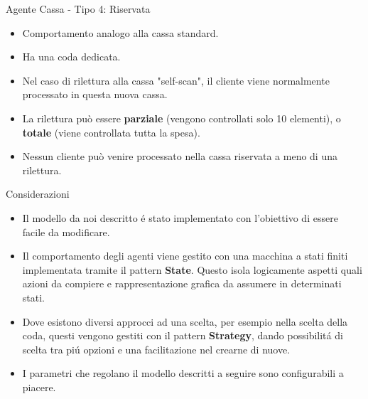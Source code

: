 \begin{frame}{Agente Cassa - Tipo 4: Riservata}
	
	\begin{itemize}
		\item Comportamento analogo alla cassa standard.
		\item Ha una coda dedicata.
		\item Nel caso di rilettura alla cassa "self-scan", il cliente viene normalmente processato in questa nuova cassa.
		\item La rilettura può essere \textbf{parziale} (vengono controllati solo 10 elementi), o \textbf{totale} (viene controllata tutta la spesa).
		\item Nessun cliente può venire processato nella cassa riservata a meno di una rilettura.
	\end{itemize}
\end{frame}




\begin{frame}{Considerazioni}
  \begin{itemize}
  \item Il modello da noi descritto é stato implementato con
    l'obiettivo di essere facile da modificare.
    
  \item Il comportamento degli agenti viene gestito con una
    macchina a stati finiti implementata tramite il pattern
    \textbf{State}.  Questo isola logicamente aspetti quali
    azioni da compiere e rappresentazione grafica da assumere in
    determinati stati.

  \item Dove esistono diversi approcci ad una scelta, per
    esempio nella scelta della coda, questi vengono gestiti con
    il pattern \textbf{Strategy}, dando possibilitá di scelta
    tra piú opzioni e una facilitazione nel crearne di nuove.

  \item I parametri che regolano il modello descritti a seguire
    sono configurabili a piacere.
  \end{itemize}
\end{frame}




